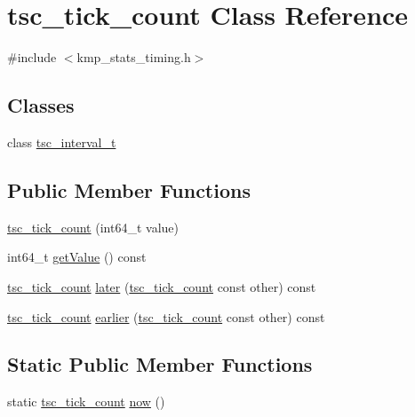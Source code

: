 \hypertarget{classtsc__tick__count}{\section{tsc\-\_\-tick\-\_\-count Class Reference}
\label{classtsc__tick__count}
}


{\ttfamily \#include $<$kmp\-\_\-stats\-\_\-timing.\-h$>$}

\subsection*{Classes}
\begin{DoxyCompactItemize}
\item 
class \hyperlink{classtsc__tick__count_1_1tsc__interval__t}{tsc\-\_\-interval\-\_\-t}
\end{DoxyCompactItemize}
\subsection*{Public Member Functions}
\begin{DoxyCompactItemize}
\item 
\hyperlink{classtsc__tick__count_aa43ce8ef46395ff35298a53fb78ff4b5}{tsc\-\_\-tick\-\_\-count} (int64\-\_\-t value)
\item 
int64\-\_\-t \hyperlink{classtsc__tick__count_a88c80c6a9d8b3b0d76b45cef2d3bc36b}{get\-Value} () const 
\item 
\hyperlink{classtsc__tick__count}{tsc\-\_\-tick\-\_\-count} \hyperlink{classtsc__tick__count_a1ed40b9912bb3ba1e671f0cf5d68678e}{later} (\hyperlink{classtsc__tick__count}{tsc\-\_\-tick\-\_\-count} const other) const 
\item 
\hyperlink{classtsc__tick__count}{tsc\-\_\-tick\-\_\-count} \hyperlink{classtsc__tick__count_ac9c170398eedc2b192eb121186a16cb4}{earlier} (\hyperlink{classtsc__tick__count}{tsc\-\_\-tick\-\_\-count} const other) const 
\end{DoxyCompactItemize}
\subsection*{Static Public Member Functions}
\begin{DoxyCompactItemize}
\item 
static \hyperlink{classtsc__tick__count}{tsc\-\_\-tick\-\_\-count} \hyperlink{classtsc__tick__count_a0caca1efab64714976683134bcdd99b4}{now} ()
\end{DoxyCompactItemize}
